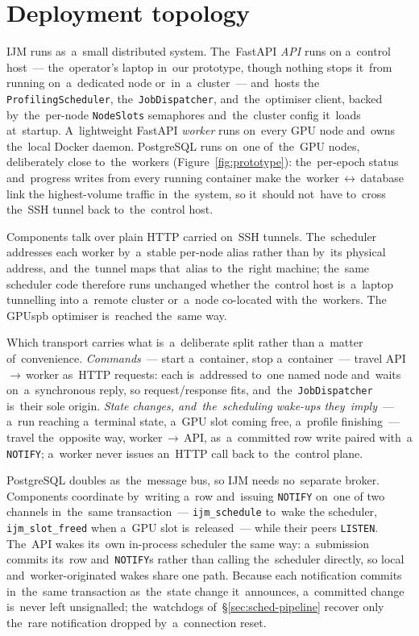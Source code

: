 \section{Deployment topology}

IJM runs as~a~small distributed system.  The~FastAPI \emph{API} runs on
a~control host~--- the~operator's laptop in~our prototype, though nothing
stops it~from running on~a~dedicated node or~in~a~cluster~--- and~hosts the
\texttt{ProfilingScheduler}, the~\texttt{JobDispatcher}, and~the~optimiser
client, backed by~the~per-node \texttt{NodeSlots} semaphores and~the~cluster
config it~loads at~startup.  A~lightweight FastAPI \emph{worker}
runs on~every GPU node and~owns the~local Docker daemon.  PostgreSQL runs
on~one of~the~GPU nodes, deliberately close to~the~workers
(Figure~\ref{fig:prototype}): the~per-epoch status and~progress writes from
every running container make the~worker\,$\leftrightarrow$\,database link the
highest-volume traffic in~the~system, so it~should not~have to~cross the~SSH
tunnel back to~the~control host.

Components talk over plain HTTP carried on~SSH tunnels.  The~scheduler
addresses each worker by~a~stable per-node alias rather than by~its physical
address, and~the~tunnel maps that~alias to~the~right machine; the~same
scheduler code therefore runs unchanged whether the~control host is~a~laptop
tunnelling into a~remote cluster or~a~node co-located with the~workers.  The
GPUspb optimiser is~reached the~same way.

Which transport carries what is~a~deliberate split rather than a~matter
of~convenience.  \emph{Commands}~--- start a~container, stop a~container~---
travel API\,$\rightarrow$\,worker as~HTTP requests: each is~addressed to~one
named node and~waits on~a~synchronous reply, so request/response fits,
and~the~\texttt{JobDispatcher} is~their sole origin.  \emph{State changes,
and~the~scheduling wake-ups they~imply}~--- a~run reaching a~terminal state,
a~GPU slot coming free, a~profile finishing~--- travel the~opposite way,
worker\,$\rightarrow$\,API, as~a~committed row write paired with~a
\texttt{NOTIFY}; a~worker never issues an~HTTP call back to~the~control
plane.

PostgreSQL doubles as~the~message bus, so IJM needs no~separate broker.
Components coordinate by~writing a~row and~issuing \texttt{NOTIFY} on~one of
two channels in~the~same transaction~--- \texttt{ijm\_schedule} to~wake the
scheduler, \texttt{ijm\_slot\_freed} when a~GPU slot is~released~--- while
their peers \texttt{LISTEN}.  The~API wakes its~own in-process scheduler the
same way: a~submission commits its~row and~\texttt{NOTIFY}s rather than calling
the~scheduler directly, so local and~worker-originated wakes share one path.
Because each notification commits in~the~same
transaction as~the~state change it~announces, a~committed change is~never
left unsignalled; the~watchdogs of~\S\ref{sec:sched-pipeline} recover only
the~rare notification dropped by~a~connection reset.

